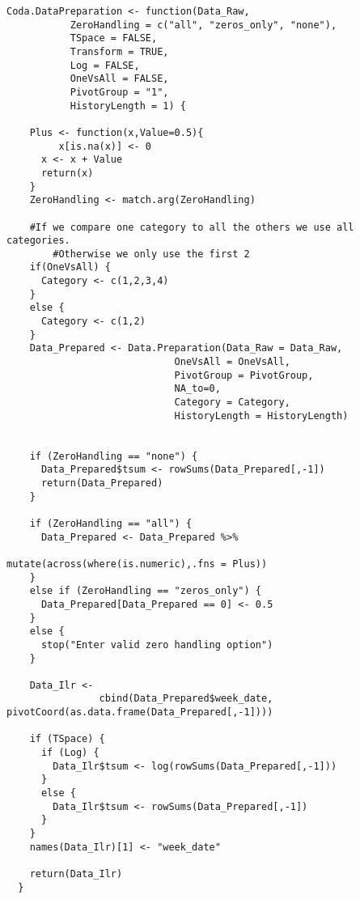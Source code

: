 \begin{verbatim}
Coda.DataPreparation <- function(Data_Raw,
           ZeroHandling = c("all", "zeros_only", "none"),
           TSpace = FALSE,
           Transform = TRUE,
           Log = FALSE,
           OneVsAll = FALSE,
           PivotGroup = "1",
           HistoryLength = 1) {

    Plus <- function(x,Value=0.5){
         x[is.na(x)] <- 0
      x <- x + Value
      return(x)
    }
    ZeroHandling <- match.arg(ZeroHandling)
    
    #If we compare one category to all the others we use all categories. 
		#Otherwise we only use the first 2
    if(OneVsAll) {
      Category <- c(1,2,3,4)
    }
    else {
      Category <- c(1,2)
    }
    Data_Prepared <- Data.Preparation(Data_Raw = Data_Raw,
                             OneVsAll = OneVsAll,
                             PivotGroup = PivotGroup,
                             NA_to=0,
                             Category = Category,
                             HistoryLength = HistoryLength)

    
    if (ZeroHandling == "none") {
      Data_Prepared$tsum <- rowSums(Data_Prepared[,-1])
      return(Data_Prepared)
    }
    
    if (ZeroHandling == "all") {
      Data_Prepared <- Data_Prepared %>% 
											 mutate(across(where(is.numeric),.fns = Plus))
    }
    else if (ZeroHandling == "zeros_only") {
      Data_Prepared[Data_Prepared == 0] <- 0.5
    }
    else {
      stop("Enter valid zero handling option")
    }
    
    Data_Ilr <- 
				cbind(Data_Prepared$week_date, pivotCoord(as.data.frame(Data_Prepared[,-1])))
    
    if (TSpace) {
      if (Log) {
        Data_Ilr$tsum <- log(rowSums(Data_Prepared[,-1]))
      }
      else {
        Data_Ilr$tsum <- rowSums(Data_Prepared[,-1])
      }
    }
    names(Data_Ilr)[1] <- "week_date"
    
    return(Data_Ilr)
  }
\end{verbatim}

